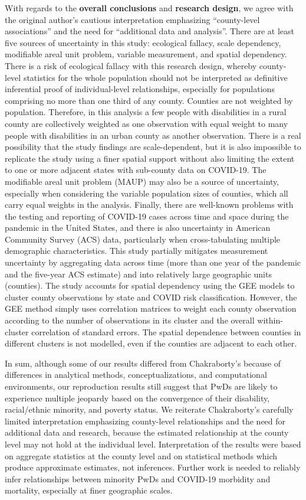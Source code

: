 \documentclass[
]{article}
\begin{document}
With regards to the \textbf{overall conclusions} and \textbf{research
design}, we agree with the original author's cautious interpretation
emphasizing ``county-level associations'' and the need for ``additional
data and analysis''. There are at least five sources of uncertainty in
this study: ecological fallacy, scale dependency, modifiable areal unit
problem, variable measurement, and spatial dependency. There is a risk
of ecological fallacy with this research design, whereby county-level
statistics for the whole population should not be interpreted as
definitive inferential proof of individual-level relationships,
especially for populations comprising no more than one third of any
county. Counties are not weighted by population. Therefore, in this
analysis a few people with disabilities in a rural county are
collectively weighted as one observation with equal weight to many
people with disabilities in an urban county as another observation.
There is a real possibility that the study findings are scale-dependent,
but it is also impossible to replicate the study using a finer spatial
support without also limiting the extent to one or more adjacent states
with sub-county data on COVID-19. The modifiable areal unit problem
(MAUP) may also be a source of uncertainty, especially when considering
the variable population sizes of counties, which all carry equal weights
in the analysis. Finally, there are well-known problems with the testing
and reporting of COVID-19 cases across time and space during the
pandemic in the United States, and there is also uncertainty in American
Community Survey (ACS) data, particularly when cross-tabulating multiple
demographic characteristics. This study partially mitigates measurement
uncertainty by aggregating data across time (more than one year of the
pandemic and the five-year ACS estimate) and into relatively large
geographic units (counties). The study accounts for spatial dependency
using the GEE models to cluster county observations by state and COVID
risk classification. However, the GEE method simply uses correlation
matrices to weight each county observation according to the number of
observations in its cluster and the overall within-cluster correlation
of standard errors. The spatial dependence between counties in different
clusters is not modelled, even if the counties are adjacent to each
other.

In sum, although some of our results differed from Chakraborty's because
of differences in analytical methods, conceptualizations, and
computational environments, our reproduction results still suggest that
PwDs are likely to experience multiple jeopardy based on the convergence
of their disability, racial/ethnic minority, and poverty status. We
reiterate Chakraborty's carefully limited interpretation emphasizing
county-level relationships and the need for additional data and
research, because the estimated relationship at the county level may not
hold at the individual level. Interpretation of the results were based
on aggregate statistics at the county level and on statistical methods
which produce approximate estimates, not inferences. Further work is
needed to reliably infer relationships between minority PwDs and
COVID-19 morbidity and mortality, especially at finer geographic scales.
\end{document}
